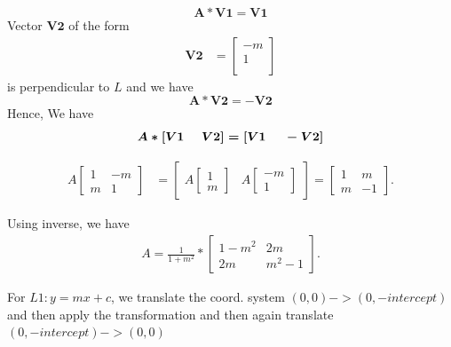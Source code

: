 \documentclass{beamer}
\begin{document}
\begin{frame}
\begin{solution}
\begin{equation}
    \boldsymbol{A*V1 = V1}
\end{equation}
Vector $\boldsymbol{V2}$ of the form 
\begin{align}
    \boldsymbol{V2} &= \begin{bmatrix}
          -m \\
          1 \\
         \end{bmatrix}
\end{align}
is perpendicular to $L$ and we have
\begin{equation}
    \boldsymbol{A*V2 = -V2}
\end{equation}
Hence,  We have 
\begin{equation}
    \boldsymbol{A*[V1\hspace{5mm}V2] = [V1\hspace{5mm}-V2]}
\end{equation}
\end{solution}
\end{frame}

\begin{frame}
\begin{solution}
\begin{align} 
	A\begin{bmatrix} 
	  1 & -m\\ 
	  m& 1 
	\end{bmatrix}&=\begin{bmatrix} 
	  A\begin{bmatrix} 
	  1 \\ 
	  m 
	\end{bmatrix}& A \begin{bmatrix} 
	  -m \\ 
	  1 
	\end{bmatrix} 
	\end{bmatrix} 
	=\begin{bmatrix} 
	  1 & m\\ 
	  m& -1 
	\end{bmatrix}. 
\end{align}

Using inverse, we have \\
\begin{align}
A=\frac{1}{1+m^2} *
\begin{bmatrix} 
	  1-m^2 & 2m\\ 
	  2m& m^2-1 
	\end{bmatrix}.
\end{align}

For $L1:y = mx+c$, we translate the coord. system $(0, 0)->(0, -intercept)$ and then apply the transformation and then again translate $(0, -intercept)->(0, 0)$
\end{solution}
\end{frame}
 
\end{document}
